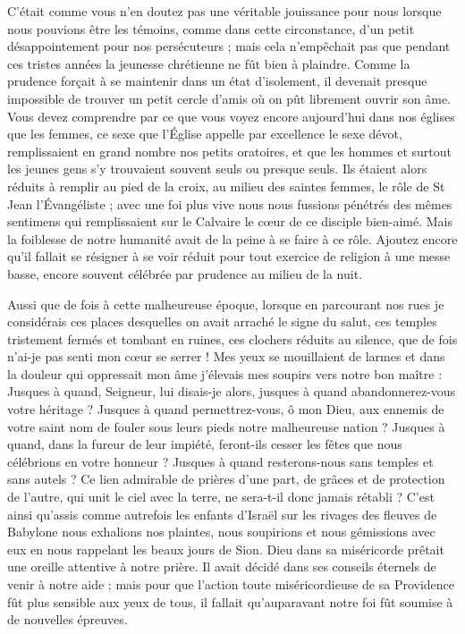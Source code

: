 C'était comme vous n'en doutez pas une véritable jouissance pour nous lorsque nous pouvions être les témoins, comme dans cette circonstance, d'un petit désappointement pour nos persécuteurs ; mais cela n'empêchait pas que pendant ces tristes années la jeunesse chrétienne ne fût bien à plaindre. Comme la prudence forçait à se maintenir dans un état d'isolement, il devenait presque impossible de trouver un petit cercle d'amis où on pût librement ouvrir son âme. Vous devez comprendre par ce que vous voyez encore aujourd'hui dans nos églises que les femmes, ce sexe que l'Église appelle par excellence le sexe dévot, remplissaient en grand nombre nos petits oratoires, et que les hommes et surtout les jeunes gens s'y trouvaient souvent seuls ou presque seuls. Ils étaient alors réduits à remplir au pied de la croix, au milieu des saintes femmes, le rôle de St Jean l'Évangéliste ; avec une foi plus vive nous nous fussions pénétrés des mêmes sentimens qui remplissaient sur le Calvaire le cœur de ce disciple bien-aimé. Mais la foiblesse de notre humanité avait de la peine à se faire à ce rôle. Ajoutez encore qu'il fallait se résigner à se voir réduit pour tout exercice de religion à une messe basse, encore souvent
célébrée par prudence au milieu de la nuit.

Aussi que de fois à cette malheureuse époque, lorsque en parcourant nos rues je considérais ces places desquelles on avait arraché le signe du salut, ces temples tristement fermés et tombant en ruines, ces clochers réduits au silence, que de fois n'ai-je pas senti mon cœur se serrer ! Mes yeux se mouillaient de larmes et dans la douleur qui oppressait mon âme j'élevais mes soupirs vers notre bon maître : Jusques à quand, Seigneur, lui disais-je alors, jusques à quand abandonnerez-vous votre héritage ? Jusques à quand permettrez-vous, ô mon Dieu, aux ennemis de votre saint nom de fouler sous leurs pieds notre malheureuse nation ? Jusques à quand, dans la fureur de leur impiété, feront-ils cesser les fêtes que nous célébrions en votre honneur ? Jusques à quand resterons-nous sans temples et sans autels ? Ce lien admirable de prières d'une part, de grâces et de protection de l'autre, qui unit le ciel avec la terre, ne sera-t-il donc jamais rétabli ? C'est ainsi qu'assis comme autrefois les enfants d'Israël sur les rivages des fleuves de Babylone nous exhalions nos plaintes, nous soupirions et nous gémissions avec eux en nous rappelant les beaux jours de Sion. Dieu dans sa miséricorde prêtait une oreille attentive à notre prière. Il avait décidé dans ses conseils éternels de venir à notre aide ; mais pour que l'action toute miséricordieuse de sa Providence fût plus sensible aux yeux de
tous, il fallait qu'auparavant notre foi fût soumise à de nouvelles épreuves.

